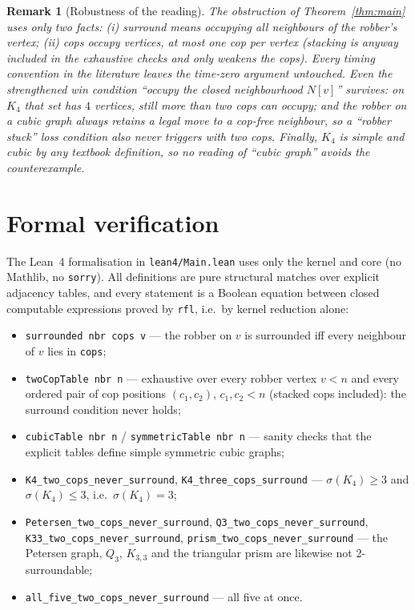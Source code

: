 \documentclass[11pt]{article}
\newtheorem{remark}{Remark}
\begin{document}
\begin{remark}[Robustness of the reading]
The obstruction of Theorem~\ref{thm:main} uses only two facts: (i) surround
means occupying \emph{all} neighbours of the robber's vertex; (ii) cops occupy
vertices, at most one cop per vertex (stacking is anyway included in the
exhaustive checks and only weakens the cops).  Every timing convention in the
literature leaves the time-zero argument untouched.  Even the strengthened win
condition ``occupy the closed neighbourhood $N[v]$'' survives: on $K_4$ that
set has $4$ vertices, still more than two cops can occupy; and the robber on a
cubic graph always retains a legal move to a cop-free neighbour, so a
``robber stuck'' loss condition also never triggers with two cops.  Finally,
$K_4$ is simple and cubic by any textbook definition, so no reading of
``cubic graph'' avoids the counterexample.
\end{remark}

\section{Formal verification}

The Lean~4 formalisation in \texttt{lean4/Main.lean} uses only the kernel and
core (no Mathlib, no \texttt{sorry}).  All definitions are pure structural
matches over explicit adjacency tables, and every statement is a Boolean
equation between closed computable expressions proved by \texttt{rfl}, i.e.\
by kernel reduction alone:

\begin{itemize}
\item \texttt{surrounded nbr cops v} --- the robber on $v$ is surrounded iff
  every neighbour of $v$ lies in \texttt{cops};
\item \texttt{twoCopTable nbr n} --- exhaustive over every robber vertex
  $v<n$ and every ordered pair of cop positions $(c_1,c_2)$, $c_1,c_2<n$
  (stacked cops included): the surround condition never holds;
\item \texttt{cubicTable nbr n} / \texttt{symmetricTable nbr n} --- sanity
  checks that the explicit tables define simple symmetric cubic graphs;
\item \texttt{K4\_two\_cops\_never\_surround}, \texttt{K4\_three\_cops\_surround}
  --- $\sigma(K_4)\ge 3$ and $\sigma(K_4)\le 3$, i.e.\ $\sigma(K_4)=3$;
\item \texttt{Petersen\_two\_cops\_never\_surround},
  \texttt{Q3\_two\_cops\_never\_surround},
  \texttt{K33\_two\_cops\_never\_surround},
  \texttt{prism\_two\_cops\_never\_surround} --- the Petersen graph, $Q_3$,
  $K_{3,3}$ and the triangular prism are likewise not 2-surroundable;
\item \texttt{all\_five\_two\_cops\_never\_surround} --- all five at once.
\end{itemize}
\end{document}
